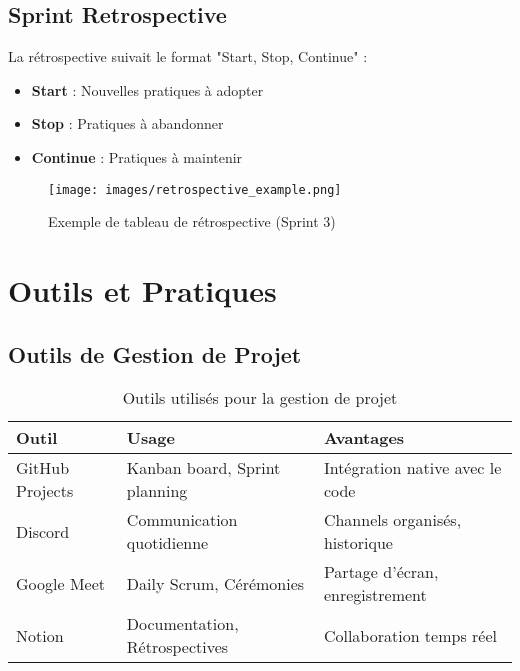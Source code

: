 \subsection{Sprint Retrospective}

La rétrospective suivait le format "Start, Stop, Continue" :
\begin{itemize}
    \item \textbf{Start} : Nouvelles pratiques à adopter
    \item \textbf{Stop} : Pratiques à abandonner
    \item \textbf{Continue} : Pratiques à maintenir
\end{itemize}

\begin{figure}[H]
    \centering
    \texttt{[image: images/retrospective\_example.png]}
    \caption{Exemple de tableau de rétrospective (Sprint 3)}
    \label{fig:retrospective_example}
\end{figure}

\section{Outils et Pratiques}

\subsection{Outils de Gestion de Projet}

\begin{table}[H]
    \centering
    \begin{tabularx}{\textwidth}{|l|X|X|}
        \hline
        \textbf{Outil} & \textbf{Usage} & \textbf{Avantages} \\
        \hline
        GitHub Projects & Kanban board, Sprint planning & Intégration native avec le code \\
        \hline
        Discord & Communication quotidienne & Channels organisés, historique \\
        \hline
        Google Meet & Daily Scrum, Cérémonies & Partage d'écran, enregistrement \\
        \hline
        Notion & Documentation, Rétrospectives & Collaboration temps réel \\
        \hline
    \end{tabularx}
    \caption{Outils utilisés pour la gestion de projet}
    \label{tab:project_tools}
\end{table}

